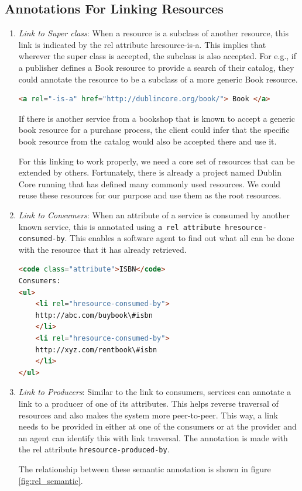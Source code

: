 \documentclass[journal]{IEEEtran}
\begin{document}
\subsection{Annotations For Linking Resources}
\begin{enumerate}
\item {\it Link to Super class}: When a resource is a subclass of another resource, this link is indicated by the rel attribute hresource-is-a. This implies that wherever the super class is accepted, the subclass is also accepted. For e.g., if a publisher defines a Book resource to provide a search of their catalog, they could annotate the resource to be a subclass of a more generic Book resource.

\begin{lstlisting}[language=html,breaklines=true]
<a rel="-is-a" href="http://dublincore.org/book/"> Book </a>
\end{lstlisting}

If there is another service from a bookshop that is known to accept a generic book resource for a purchase process, the client could infer that the specific book resource from the catalog would also be accepted there and use it.

For this linking to work properly, we need a core set of resources that can be extended by others. Fortunately, there is already a project named Dublin Core running that has defined many commonly used resources. We could reuse these resources for our purpose and use them as the root resources.

\item {\it Link to Consumers}: When an attribute of a service is consumed by another known service, this is annotated using \texttt{a rel attribute hresource-consumed-by}. This enables a software agent to find out what all can be done with the resource that it has already retrieved.

\begin{lstlisting}[language=html,breaklines=true]
<code class="attribute">ISBN</code>
Consumers:
<ul>
    <li rel="hresource-consumed-by">
    http://abc.com/buybook\#isbn
    </li>
    <li rel="hresource-consumed-by">
    http://xyz.com/rentbook\#isbn
    </li>
</ul>
\end{lstlisting}

\item {\it Link to Producers}: Similar to the link to consumers, services can annotate a link to a producer of one of its attributes. This helps reverse traversal of resources and also makes the system more peer-to-peer. This way, a link needs to be provided in either at one of the consumers or at the provider and an agent can identify this with link traversal. The annotation is made with the rel attribute \texttt{hresource-produced-by}.

The relationship between these semantic annotation is shown in figure \ref{fig:rel_semantic}.

\end{enumerate}
\end{document}
